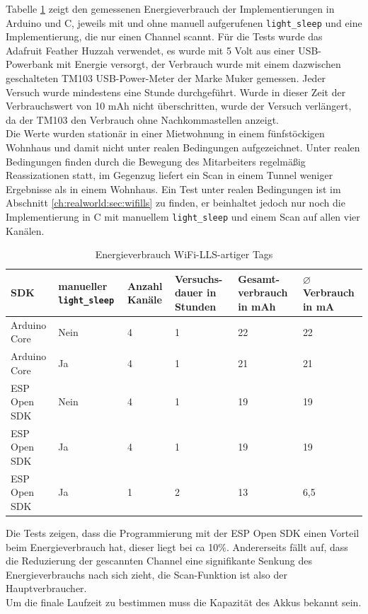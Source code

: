 Tabelle \ref{table:llsconsumption} zeigt den gemessenen Energieverbrauch der Implementierungen in Arduino und C, jeweils mit und ohne manuell aufgerufenen \texttt{light\_sleep} und eine Implementierung, die nur einen Channel scannt.
Für die Tests wurde das Adafruit Feather Huzzah verwendet, es wurde mit 5 Volt aus einer USB-Powerbank mit Energie versorgt, der Verbrauch wurde mit einem dazwischen geschalteten TM103 USB-Power-Meter der Marke Muker gemessen. 
Jeder Versuch wurde mindestens eine Stunde durchgeführt.
Wurde in dieser Zeit der Verbrauchswert von 10 mAh nicht überschritten, wurde der Versuch verlängert, da der TM103 den Verbrauch ohne Nachkommastellen anzeigt.\\
Die Werte wurden stationär in einer Mietwohnung in einem fünfstöckigen Wohnhaus und damit nicht unter realen Bedingungen aufgezeichnet.
Unter realen Bedingungen finden durch die Bewegung des Mitarbeiters regelmäßig Reassizationen statt, im Gegenzug liefert ein Scan in einem Tunnel weniger Ergebnisse als in einem Wohnhaus.
Ein Test unter realen Bedingungen ist im Abschnitt \ref{ch:realworld:sec:wifills} zu finden, er beinhaltet jedoch nur noch die Implementierung in C mit manuellem \texttt{light\_sleep} und einem Scan auf allen vier Kanälen.

\begin{table}[h]
	\centering
	\caption{Energieverbrauch WiFi-LLS-artiger Tags}
	\label{table:llsconsumption}
	\begin{tabular}{p{3cm}|p{2.2cm}|p{1.5cm}|p{2cm}|p{2cm}|p{2cm}}
		SDK & manueller \texttt{light\_sleep} & Anzahl Kanäle & Versuchs-dauer in Stunden & Gesamt-verbrauch in mAh & $\varnothing$ Verbrauch in mA  \\
		\hline
		Arduino Core & Nein & 4 & 1 & 22 & 22 \\
		Arduino Core & Ja & 4 & 1 & 21 & 21 \\
		ESP Open SDK & Nein & 4 & 1 & 19 & 19 \\
		ESP Open SDK & Ja & 4 & 1 & 19 & 19 \\
		\hline
		ESP Open SDK & Ja & 1 & 2 & 13 & 6,5 \\
	\end{tabular}
\end{table}

Die Tests zeigen, dass die Programmierung mit der ESP Open SDK einen Vorteil beim Energieverbrauch hat, dieser liegt bei ca 10\%.
Andererseits fällt auf, dass die Reduzierung der gescannten Channel eine signifikante Senkung des Energieverbrauchs nach sich zieht, die Scan-Funktion ist also der Hauptverbraucher.\\
Um die finale Laufzeit zu bestimmen muss die Kapazität des Akkus bekannt sein.

